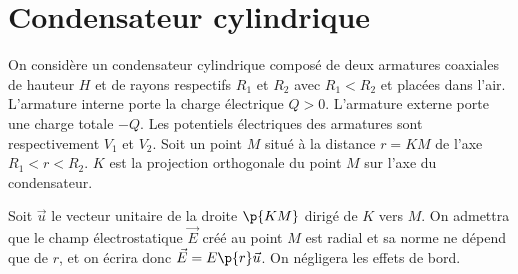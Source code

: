 \documentclass[a4paper,french,bookmarks]{article}
\begin{document}
\begin{enumerate}[resume]
        \noafter
        \nobefore\yesafter
    \end{enumerate}
    
    \section{Condensateur cylindrique}
    
    \begin{minipage}{0.5\linewidth}
    \end{minipage}
    \begin{minipage}{0.5\linewidth}
        On considère un condensateur cylindrique composé de deux armatures coaxiales de hauteur $H$ et de rayons respectifs $R_1$ et $R_2$ avec $R_1 < R_2$ et placées dans l'air. L'armature interne porte la charge électrique $Q > 0$. L'armature externe porte une charge totale $-Q$. Les potentiels électriques des armatures sont respectivement $V_1$ et $V_2$. Soit un point $M$ situé à la distance $r = KM$  de l'axe $R_1 < r < R_2$. $K$ est la projection orthogonale du point $M$ sur l'axe du condensateur.\medskip
        
        Soit $\vec u$ le vecteur unitaire de la droite $\p{KM}$ dirigé de $K$ vers $M$. On admettra que le champ électrostatique $\vec E$ créé au point $M$ est radial et sa norme ne dépend que de $r$, et on écrira donc $\vec E = E\p{r}\vec u$. On négligera les effets de bord.
    \end{minipage}
    
    
    
\end{document}
